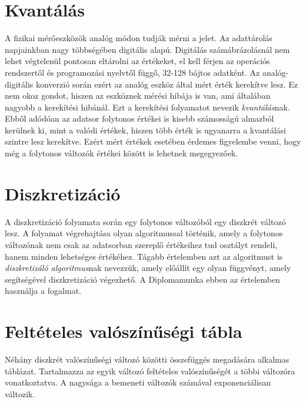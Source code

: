 \section{Kvantálás}
A fizikai mérőeszközök analóg módon tudják mérni a jelet. Az adattárolás napjainkban nagy többségében digitális alapú. Digitálás számábrázolásnál nem lehet végtelenül pontosan eltárolni az értékeket, el kell férjen az operációs rendszertől és programozási nyelvtől függő, 32-128 bájtos adatként. Az analóg-digitális konverzió során ezért az analóg eszköz által mért érték kerekítve lesz. Ez nem okoz gondot, hiszen az eszköznek mérési hibája is van, ami általában nagyobb a kerekítési hibánál. Ezt a kerekítési folyamatot nevezik \emph{kvantálás}nak. Ebből adódóan az adatsor folytonos értékei is kisebb számosságú almazból kerülnek ki, mint a valódi értékek, hiszen több érték is ugyanarra a kvantálási szintre lesz kerekítve. Ezért mért értékek esetében érdemes figyelembe venni, hogy még a folytonos változók értékei között is lehetnek megegyezőek.

\section{Diszkretizáció}
A diszkretizáció folyamata során egy folytonos változóból egy diszkrét változó lesz. A folyamat végrehajtása olyan algoritmussal történik, amely a folytonos változónak nem csak az adatsorban szereplő értékeihez tud osztályt rendeli, hanem minden lehetséges értékéhez. Tágabb értelemben azt az algoritmust is \emph{diszkretizáló algoritmus}nak nevezzük, amely előállít egy olyan függvényt, amely segítségével diszkretizáció végezhető. A Diplomamunka ebben az értelemben használja a fogalmat.

\section{Feltételes valószínűségi tábla}
Néhány diszkrét valószínűségi változó közötti összefüggés megadására alkalmas táblázat. Tartalmazza az egyik változó feltételes valószínűségét a többi változóra vonatkoztatva. A nagysága a bemeneti változók számával exponenciálisan változik.

